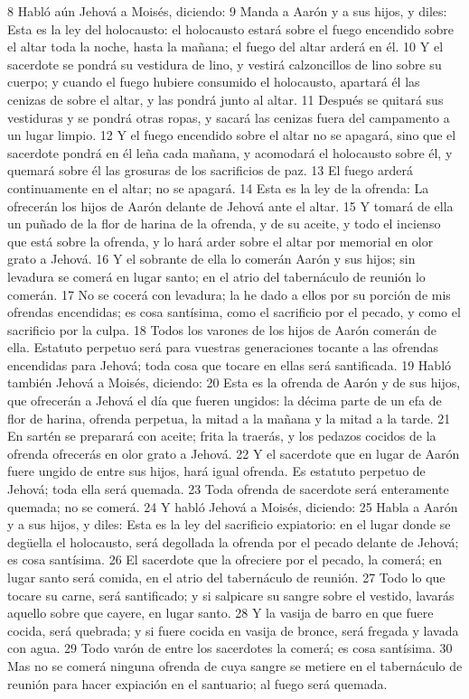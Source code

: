 8 Habló aún Jehová a Moisés, diciendo:
9 Manda a Aarón y a sus hijos, y diles: Esta es la ley del holocausto: el holocausto estará sobre el fuego encendido sobre el altar toda la noche, hasta la mañana; el fuego del altar arderá en él.
10 Y el sacerdote se pondrá su vestidura de lino, y vestirá calzoncillos de lino sobre su cuerpo; y cuando el fuego hubiere consumido el holocausto, apartará él las cenizas de sobre el altar, y las pondrá junto al altar.
11 Después se quitará sus vestiduras y se pondrá otras ropas, y sacará las cenizas fuera del campamento a un lugar limpio.
12 Y el fuego encendido sobre el altar no se apagará, sino que el sacerdote pondrá en él leña cada mañana, y acomodará el holocausto sobre él, y quemará sobre él las grosuras de los sacrificios de paz.
13 El fuego arderá continuamente en el altar; no se apagará.
14 Esta es la ley de la ofrenda: La ofrecerán los hijos de Aarón delante de Jehová ante el altar.
15 Y tomará de ella un puñado de la flor de harina de la ofrenda, y de su aceite, y todo el incienso que está sobre la ofrenda, y lo hará arder sobre el altar por memorial en olor grato a Jehová.
16 Y el sobrante de ella lo comerán Aarón y sus hijos; sin levadura se comerá en lugar santo; en el atrio del tabernáculo de reunión lo comerán.
17 No se cocerá con levadura; la he dado a ellos por su porción de mis ofrendas encendidas; es cosa santísima, como el sacrificio por el pecado, y como el sacrificio por la culpa.
18 Todos los varones de los hijos de Aarón comerán de ella. Estatuto perpetuo será para vuestras generaciones tocante a las ofrendas encendidas para Jehová; toda cosa que tocare en ellas será santificada.
19 Habló también Jehová a Moisés, diciendo:
20 Esta es la ofrenda de Aarón y de sus hijos, que ofrecerán a Jehová el día que fueren ungidos: la décima parte de un efa   de flor de harina, ofrenda perpetua, la mitad a la mañana y la mitad a la tarde.
21 En sartén se preparará con aceite; frita la traerás, y los pedazos cocidos de la ofrenda ofrecerás en olor grato a Jehová.
22 Y el sacerdote que en lugar de Aarón fuere ungido de entre sus hijos, hará igual ofrenda. Es estatuto perpetuo de Jehová; toda ella será quemada.
23 Toda ofrenda de sacerdote será enteramente quemada; no se comerá.
24 Y habló Jehová a Moisés, diciendo:
25 Habla a Aarón y a sus hijos, y diles: Esta es la ley del sacrificio expiatorio: en el lugar donde se degüella el holocausto, será degollada la ofrenda por el pecado delante de Jehová; es cosa santísima.
26 El sacerdote que la ofreciere por el pecado, la comerá; en lugar santo será comida, en el atrio del tabernáculo de reunión.
27 Todo lo que tocare su carne, será santificado; y si salpicare su sangre sobre el vestido, lavarás aquello sobre que cayere, en lugar santo.
28 Y la vasija de barro en que fuere cocida, será quebrada; y si fuere cocida en vasija de bronce, será fregada y lavada con agua.
29 Todo varón de entre los sacerdotes la comerá; es cosa santísima.
30 Mas no se comerá ninguna ofrenda de cuya sangre se metiere en el tabernáculo de reunión para hacer expiación en el santuario; al fuego será quemada.

